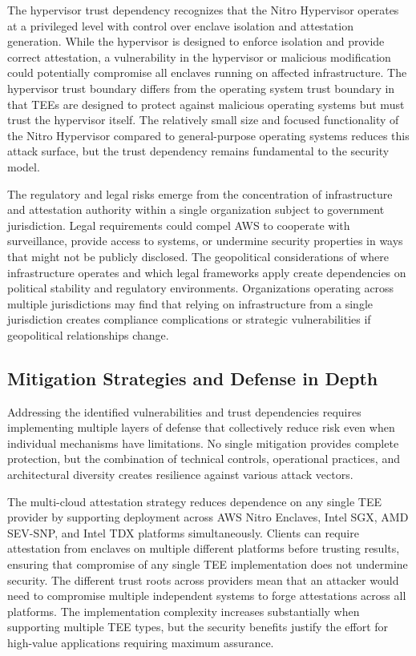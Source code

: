 The hypervisor trust dependency recognizes that the Nitro Hypervisor operates at a privileged level with control over enclave isolation and attestation generation. While the hypervisor is designed to enforce isolation and provide correct attestation, a vulnerability in the hypervisor or malicious modification could potentially compromise all enclaves running on affected infrastructure. The hypervisor trust boundary differs from the operating system trust boundary in that TEEs are designed to protect against malicious operating systems but must trust the hypervisor itself. The relatively small size and focused functionality of the Nitro Hypervisor compared to general-purpose operating systems reduces this attack surface, but the trust dependency remains fundamental to the security model.

The regulatory and legal risks emerge from the concentration of infrastructure and attestation authority within a single organization subject to government jurisdiction. Legal requirements could compel AWS to cooperate with surveillance, provide access to systems, or undermine security properties in ways that might not be publicly disclosed. The geopolitical considerations of where infrastructure operates and which legal frameworks apply create dependencies on political stability and regulatory environments. Organizations operating across multiple jurisdictions may find that relying on infrastructure from a single jurisdiction creates compliance complications or strategic vulnerabilities if geopolitical relationships change.

\subsection{Mitigation Strategies and Defense in Depth}

Addressing the identified vulnerabilities and trust dependencies requires implementing multiple layers of defense that collectively reduce risk even when individual mechanisms have limitations. No single mitigation provides complete protection, but the combination of technical controls, operational practices, and architectural diversity creates resilience against various attack vectors.

The multi-cloud attestation strategy reduces dependence on any single TEE provider by supporting deployment across AWS Nitro Enclaves, Intel SGX, AMD SEV-SNP, and Intel TDX platforms simultaneously. Clients can require attestation from enclaves on multiple different platforms before trusting results, ensuring that compromise of any single TEE implementation does not undermine security. The different trust roots across providers mean that an attacker would need to compromise multiple independent systems to forge attestations across all platforms. The implementation complexity increases substantially when supporting multiple TEE types, but the security benefits justify the effort for high-value applications requiring maximum assurance.

